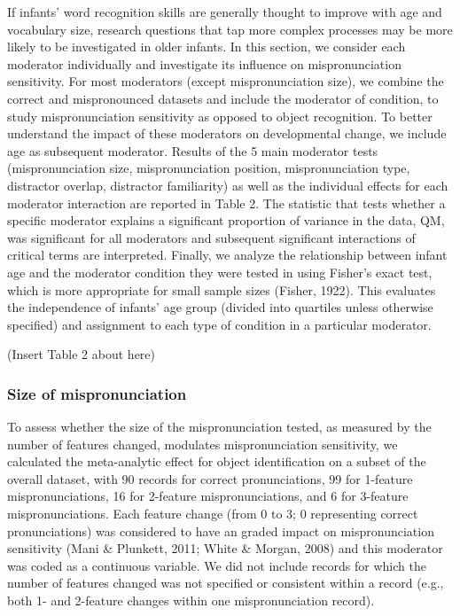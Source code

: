 \documentclass[
  english,
  man, noextraspace]{apa6}
\begin{document}
If infants' word recognition skills are generally thought to improve with age and vocabulary size, research questions that tap more complex processes may be more likely to be investigated in older infants. In this section, we consider each moderator individually and investigate its influence on mispronunciation sensitivity. For most moderators (except mispronunciation size), we combine the correct and mispronounced datasets and include the moderator of condition, to study mispronunciation sensitivity as opposed to object recognition. To better understand the impact of these moderators on developmental change, we include age as subsequent moderator. Results of the 5 main moderator tests (mispronunciation size, mispronunciation position, mispronunciation type, distractor overlap, distractor familiarity) as well as the individual effects for each moderator interaction are reported in Table 2. The statistic that tests whether a specific moderator explains a significant proportion of variance in the data, QM, was significant for all moderators and subsequent significant interactions of critical terms are interpreted. Finally, we analyze the relationship between infant age and the moderator condition they were tested in using Fisher's exact test, which is more appropriate for small sample sizes (Fisher, 1922). This evaluates the independence of infants' age group (divided into quartiles unless otherwise specified) and assignment to each type of condition in a particular moderator.

(Insert Table 2 about here)

\hypertarget{size-of-mispronunciation}{%
\subsubsection{Size of mispronunciation}\label{size-of-mispronunciation}}

To assess whether the size of the mispronunciation tested, as measured by the number of features changed, modulates mispronunciation sensitivity, we calculated the meta-analytic effect for object identification on a subset of the overall dataset, with 90 records for correct pronunciations, 99 for 1-feature mispronunciations, 16 for 2-feature mispronunciations, and 6 for 3-feature mispronunciations. Each feature change (from 0 to 3; 0 representing correct pronunciations) was considered to have an graded impact on mispronunciation sensitivity (Mani \& Plunkett, 2011; White \& Morgan, 2008) and this moderator was coded as a continuous variable. We did not include records for which the number of features changed was not specified or consistent within a record (e.g., both 1- and 2-feature changes within one mispronunciation record).
\end{document}
